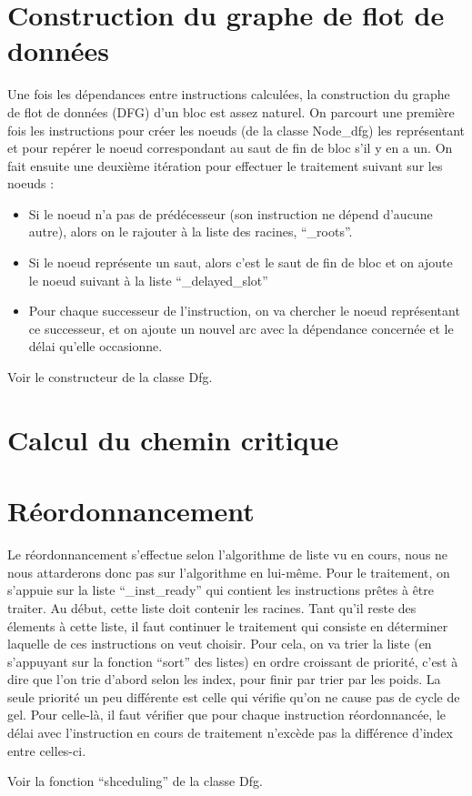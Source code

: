 \documentclass[a4paper, 11pt]{report}
\begin{document}
\section{Construction du graphe de flot de données}

Une fois les dépendances entre instructions calculées, la construction du graphe de flot de données (DFG) d'un bloc est assez naturel. On parcourt une première fois les instructions pour créer les noeuds (de la classe Node\_dfg) les représentant et pour repérer le noeud correspondant au saut de fin de bloc s'il y en a un. On fait ensuite une deuxième itération pour effectuer le traitement suivant sur les noeuds :
\begin{itemize}
\item Si le noeud n'a pas de prédécesseur (son instruction ne dépend d'aucune autre), alors on le rajouter à la liste des racines, ``\_roots''.
\item Si le noeud représente un saut, alors c'est le saut de fin de bloc et on ajoute le noeud suivant à la liste ``\_delayed\_slot''
\item Pour chaque successeur de l'instruction, on va chercher le noeud représentant ce successeur, et on ajoute un nouvel arc avec la dépendance concernée et le délai qu'elle occasionne.
\end{itemize}

Voir le constructeur de la classe Dfg.

\section{Calcul du chemin critique}



\section{Réordonnancement}

Le réordonnancement s'effectue selon l'algorithme de liste vu en cours, nous ne nous attarderons donc pas sur l'algorithme en lui-même. Pour le traitement, on s'appuie sur la liste ``\_inst\_ready'' qui contient les instructions prêtes à être traiter. Au début, cette liste doit contenir les racines. Tant qu'il reste des élements à cette liste, il faut continuer le traitement qui consiste en déterminer laquelle de ces instructions on veut choisir. Pour cela, on va trier la liste (en s'appuyant sur la fonction ``sort'' des listes) en ordre croissant de priorité, c'est à dire que l'on trie d'abord selon les index, pour finir par trier par les poids. La seule priorité un peu différente est celle qui vérifie qu'on ne cause pas de cycle de gel. Pour celle-là, il faut vérifier que pour chaque instruction réordonnancée, le délai avec l'instruction en cours de traitement n'excède pas la différence d'index entre celles-ci.

Voir la fonction ``shceduling'' de la classe Dfg.
\end{document}
